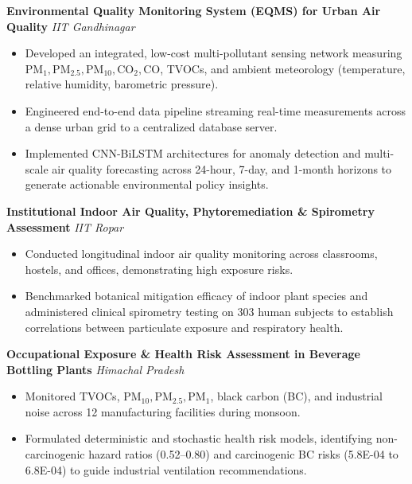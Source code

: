 \documentclass[10pt,a4paper]{article}
\begin{document}
\textbf{Environmental Quality Monitoring System (EQMS) for Urban Air Quality} \hfill \textit{IIT Gandhinagar}
\begin{itemize}
    \item Developed an integrated, low-cost multi-pollutant sensing network measuring $\text{PM}_1, \text{PM}_{2.5}, \text{PM}_{10}, \text{CO}_2, \text{CO}$, TVOCs, and ambient meteorology (temperature, relative humidity, barometric pressure).
    \item Engineered end-to-end data pipeline streaming real-time measurements across a dense urban grid to a centralized database server.
    \item Implemented CNN-BiLSTM architectures for anomaly detection and multi-scale air quality forecasting across 24-hour, 7-day, and 1-month horizons to generate actionable environmental policy insights.
\end{itemize}

\vspace{2pt}
\textbf{Institutional Indoor Air Quality, Phytoremediation \& Spirometry Assessment} \hfill \textit{IIT Ropar}
\begin{itemize}
    \item Conducted longitudinal indoor air quality monitoring across classrooms, hostels, and offices, demonstrating high exposure risks.
    \item Benchmarked botanical mitigation efficacy of indoor plant species and administered clinical spirometry testing on 303 human subjects to establish correlations between particulate exposure and respiratory health.
\end{itemize}

\vspace{2pt}
\textbf{Occupational Exposure \& Health Risk Assessment in Beverage Bottling Plants} \hfill \textit{Himachal Pradesh}
\begin{itemize}
    \item Monitored TVOCs, $\text{PM}_{10}, \text{PM}_{2.5}, \text{PM}_1$, black carbon (BC), and industrial noise across 12 manufacturing facilities during monsoon.
    \item Formulated deterministic and stochastic health risk models, identifying non-carcinogenic hazard ratios (0.52--0.80) and carcinogenic BC risks (5.8E-04 to 6.8E-04) to guide industrial ventilation recommendations.
\end{itemize}

\end{document}
